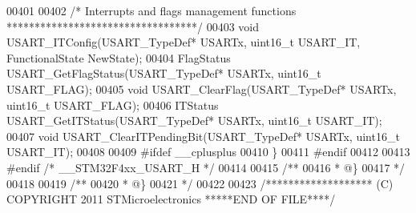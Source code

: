 \begin{DoxyCode}
00401 
00402 \textcolor{comment}{/* Interrupts and flags management functions **********************************/}
00403 \textcolor{keywordtype}{void} USART_ITConfig(USART\_TypeDef* USARTx, uint16\_t USART\_IT, FunctionalState NewState);
00404 FlagStatus USART_GetFlagStatus(USART\_TypeDef* USARTx, uint16\_t USART\_FLAG);
00405 \textcolor{keywordtype}{void} USART_ClearFlag(USART\_TypeDef* USARTx, uint16\_t USART\_FLAG);
00406 ITStatus USART_GetITStatus(USART\_TypeDef* USARTx, uint16\_t USART\_IT);
00407 \textcolor{keywordtype}{void} USART_ClearITPendingBit(USART\_TypeDef* USARTx, uint16\_t USART\_IT);
00408 
00409 \textcolor{preprocessor}{#}\textcolor{preprocessor}{ifdef} \_\_cplusplus
00410 \}
00411 \textcolor{preprocessor}{#}\textcolor{preprocessor}{endif}
00412 
00413 \textcolor{preprocessor}{#}\textcolor{preprocessor}{endif} \textcolor{comment}{/* \_\_STM32F4xx\_USART\_H */}
00414 
00415 \textcolor{comment}{/**}
00416 \textcolor{comment}{  * @\}}
00417 \textcolor{comment}{  */}
00418 
00419 \textcolor{comment}{/**}
00420 \textcolor{comment}{  * @\}}
00421 \textcolor{comment}{  */}
00422 
00423 \textcolor{comment}{/******************* (C) COPYRIGHT 2011 STMicroelectronics *****END OF FILE****/}
\end{DoxyCode}
